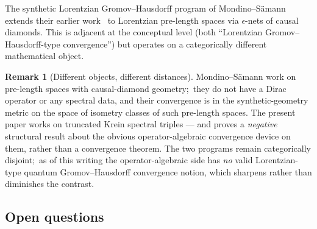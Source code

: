 \documentclass[11pt,a4paper]{article}
\theoremstyle{plain}
\theoremstyle{definition}
\newtheorem{remark}[theorem]{Remark}
\begin{document}
The synthetic Lorentzian Gromov--Hausdorff program of
Mondino--S\"amann~\cite{mondino_samann2025} extends their earlier
work~\cite{minguzzi_suhr2024} to Lorentzian pre-length spaces via
$\epsilon$-nets of causal diamonds. This is adjacent at the conceptual
level (both ``Lorentzian Gromov--Hausdorff-type convergence'') but
operates on a categorically different mathematical object.

\begin{remark}[Different objects, different distances]\label{rem:mondino_samann}
Mondino--S\"amann work on pre-length spaces with causal-diamond
geometry;\ they do not have a Dirac operator or any spectral data, and
their convergence is in the synthetic-geometry metric on the space of
isometry classes of such pre-length spaces. The present paper works on
truncated Krein spectral triples — and proves a \emph{negative}
structural result about the obvious operator-algebraic convergence
device on them, rather than a convergence theorem. The two
programs remain categorically disjoint;\ as of this writing the
operator-algebraic side has \emph{no} valid Lorentzian-type
quantum Gromov--Hausdorff convergence notion, which sharpens rather
than diminishes the contrast.
\end{remark}

\subsection{Open questions}\label{sec:open}
\end{document}
